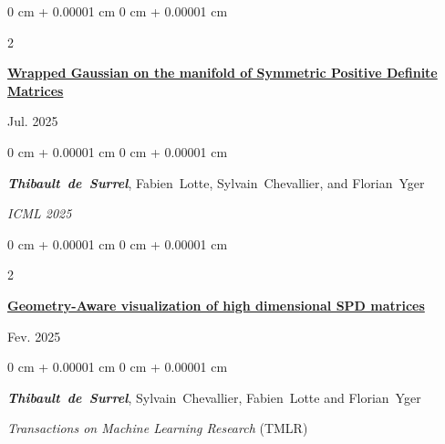 \documentclass[10pt, letterpaper]{article}
\newenvironment{onecolentry}{
    \begin{adjustwidth}{
        0 cm + 0.00001 cm
    }{
        0 cm + 0.00001 cm
    }
}{
    \end{adjustwidth}
} %
\newenvironment{twocolentry}[2][]{
    \onecolentry
    \def\secondColumn{#2}
    \setcolumnwidth{\fill, 4.5 cm}
    \begin{paracol}{2}
}{
    \switchcolumn \raggedleft \secondColumn
    \end{paracol}
    \endonecolentry
} %
\begin{document}
        \vspace{0.2cm}

        \begin{samepage}
            \begin{twocolentry}{
                Jul. 2025
            }
                \textbf{\href{https://openreview.net/pdf?id=EhStXG4dCS}{Wrapped Gaussian on the manifold of Symmetric Positive Definite Matrices}}
            \end{twocolentry}

            \vspace{0.10 cm}
            
            \begin{onecolentry}
                \mbox{\textbf{\textit{Thibault de Surrel}}}, \mbox{Fabien Lotte}, \mbox{Sylvain Chevallier}, and \mbox{Florian Yger}
                \vspace{0.10 cm}
                
        \textit{ICML 2025} 
        \end{onecolentry}
        \end{samepage}

        \vspace{0.2cm}

        \begin{samepage}
            \begin{twocolentry}{
                Fev. 2025
            }
                \textbf{\href{https://hal.science/hal-04942016/document}{Geometry-Aware visualization of high dimensional SPD matrices}}
            \end{twocolentry}
            \vspace{0.10 cm}
            \begin{onecolentry}
                \mbox{\textbf{\textit{Thibault de Surrel}}}, \mbox{Sylvain Chevallier}, \mbox{Fabien Lotte} and \mbox{Florian Yger}
                \vspace{0.10 cm}
                
        \textit{Transactions on Machine Learning Research} (TMLR)
        \end{onecolentry}
        \end{samepage}

        \vspace{0.2cm}
\end{document}
